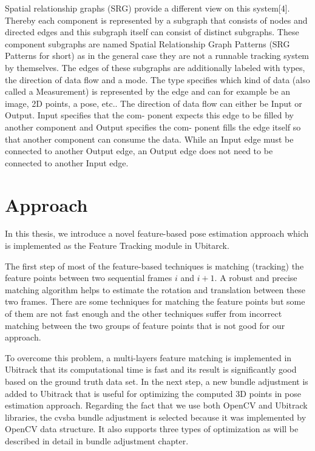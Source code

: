 Spatial relationship graphs (SRG) provide a different view on this system[4]. Thereby each component is represented by a subgraph that consists of nodes and directed edges and this subgraph itself can consist of distinct subgraphs. These component subgraphs are named Spatial Relationship Graph Patterns (SRG Patterns for short) as in the general case they are not a runnable tracking system by themselves. The edges of these subgraphs are additionally labeled with types, the direction of data flow and a mode.
The type specifies which kind of data (also called a Measurement) is represented by the edge and can for example be an image, 2D points, a pose, etc..
The direction of data flow can either be Input or Output. Input specifies that the com- ponent expects this edge to be filled by another component and Output specifies the com- ponent fills the edge itself so that another component can consume the data. While an Input edge must be connected to another Output edge, an Output edge does not need to be connected to another Input edge.


\section {Approach} \label{sec:approach}
In this thesis, we introduce a novel feature-based pose estimation approach which is implemented as the Feature Tracking module in Ubitarck. 

The first step of most of the feature-based techniques is matching (tracking) the feature points between two sequential frames $i$ and $i+1$. A robust and precise matching algorithm helps to estimate the rotation and translation between these two frames. There are some techniques for matching the feature points but some of them are not fast enough and the other techniques suffer from incorrect matching between the two groups of feature points that is not good for our approach. 

To overcome this problem, a multi-layers feature matching is implemented in Ubitrack that its computational time is fast and its result is significantly good based on the ground truth data set. In the next step, a new bundle adjustment is added to Ubitrack that is useful for optimizing the computed 3D points in pose estimation approach. Regarding the fact that we use both OpenCV and Ubitrack libraries, the cvsba bundle adjustment is selected because it was implemented by OpenCV data structure. It also supports three types of optimization as will be  described in detail in bundle adjustment chapter.

